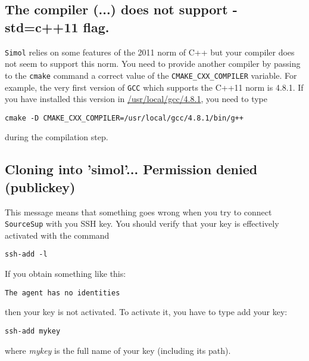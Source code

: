 \documentclass[12pt]{book}
\newcommand{\Simol}{\texttt{Simol}\xspace}
\newcommand{\SourceSup}{\texttt{SourceSup}\xspace}
\begin{document}
\subsection{The compiler (...) does not support -std=c++11 flag.}

\Simol relies on some features of the 2011 norm of C++ but your compiler does not seem to support this norm. You need to provide another compiler by passing to the \texttt{cmake} command a correct value of the \texttt{CMAKE\_CXX\_COMPILER} variable. For example, the very first version of \texttt{GCC} which supports the C++11 norm is 4.8.1. If you have installed this version in \url{/usr/local/gcc/4.8.1}, you need to type
\lstset{language=bash} 
\begin{lstlisting}
cmake -D CMAKE_CXX_COMPILER=/usr/local/gcc/4.8.1/bin/g++
\end{lstlisting}
during the compilation step.

\subsection{Cloning into 'simol'... Permission denied (publickey)}

This message means that something goes wrong when you try to connect \SourceSup with you SSH key. You should verify that your key is effectively activated with the command
\lstset{language=bash} 
\begin{lstlisting}
ssh-add -l
\end{lstlisting}
If you obtain something like this:
\lstset{language=bash} 
\begin{lstlisting}
The agent has no identities
\end{lstlisting}
then your key is not activated. To activate it, you have to type add your key:
\lstset{language=bash} 
\begin{lstlisting}
ssh-add mykey
\end{lstlisting}
where \textit{mykey} is the full name of your key (including its path).
\end{document}
